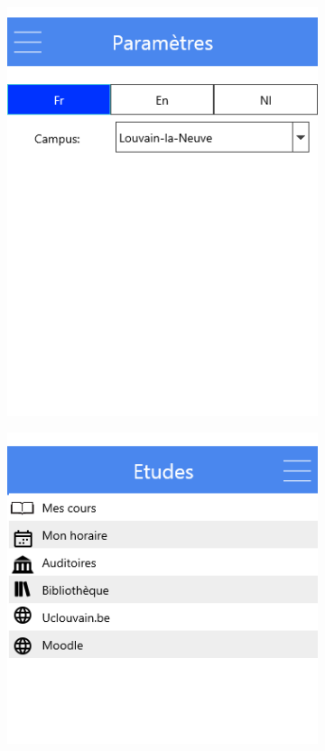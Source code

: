 \documentclass{eplmastersthesis}
\begin{document}
\begin{figure}[H]
    \begin{subfigure}[b]{0.3\textwidth}
        \includegraphics[width=\textwidth]{Images/InVision/settings.png}
    \end{subfigure}
    \begin{subfigure}[b]{0.3\textwidth}
        \includegraphics[width=\textwidth]{Images/InVision/menu-etude.png}
    \end{subfigure}
\end{figure}
\end{document}
